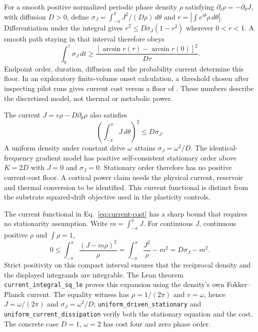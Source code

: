\documentclass{article}
\begin{document}
For a smooth positive normalized periodic phase density $\rho$ satisfying
$\partial_t\rho=-\partial_\theta J$, with diffusion $D>0$, define
$\sigma_J=\int_{-\pi}^{\pi}J^2/(D\rho)\,d\theta$ and
$r=|\int e^{i\theta}\rho\,d\theta|$. Differentiation under the integral
gives $\dot r^2\leq D\sigma_J(1-r^2)$ wherever $0<r<1$. A smooth path
staying in that interval therefore obeys
\begin{equation}
 \int_0^\tau\sigma_J\,dt\geq
 \frac{[\arcsin r(\tau)-\arcsin r(0)]^2}{D\tau}.
 \label{eq:order-change-cost}
\end{equation}
Endpoint order, duration, diffusion and the probability current determine
this floor. In an exploratory finite-volume onset calculation, a threshold
chosen after inspecting pilot runs gives current cost
\gOnsetCurrentCost{} versus a floor of \gOnsetCurrentFloor{}. These numbers
describe the discretized model, not thermal or metabolic power.

The current $J=v\rho-D\partial_\theta\rho$ also satisfies
\begin{equation}
 \left(\int_{-\pi}^{\pi}J\,d\theta\right)^2\leq D\sigma_J.
 \label{eq:current-cost}
\end{equation}
A uniform density under constant drive $\omega$ attains
$\sigma_J=\omega^2/D$. The identical-frequency gradient model has positive
self-consistent stationary order above $K=2D$ with $J=0$ and
$\sigma_J=0$. Stationary order therefore has no positive current-cost floor.
A cortical power claim needs the physical current, reservoir and thermal
conversion to be identified. This current functional is distinct from the
substrate squared-drift objective used in the plasticity controls.

The current functional in Eq.~\eqref{eq:current-cost} has a sharp bound that
requires no stationarity assumption. Write $m=\int_{-\pi}^{\pi}J$.
For continuous $J$, continuous positive $\rho$ and $\int\rho=1$,
\[
 0\leq\int_{-\pi}^{\pi}\frac{(J-m\rho)^2}{\rho}
   =\int_{-\pi}^{\pi}\frac{J^2}{\rho}-m^2
   =D\sigma_J-m^2.
\]
Strict positivity on this compact interval ensures that the reciprocal density
and the displayed integrands are integrable. The Lean theorem
\nolinkurl{current_integral_sq_le}
proves this expansion using the density's own Fokker--Planck current.
The equality witness has $\rho=1/(2\pi)$ and $v=\omega$, hence
$J=\omega/(2\pi)$ and $\sigma_J=\omega^2/D$;
\nolinkurl{uniform_driven_stationary} and
\nolinkurl{uniform_current_dissipation} verify both
the stationary equation and the cost. The concrete case $D=1$, $\omega=2$
has cost four and zero phase order.
\end{document}
